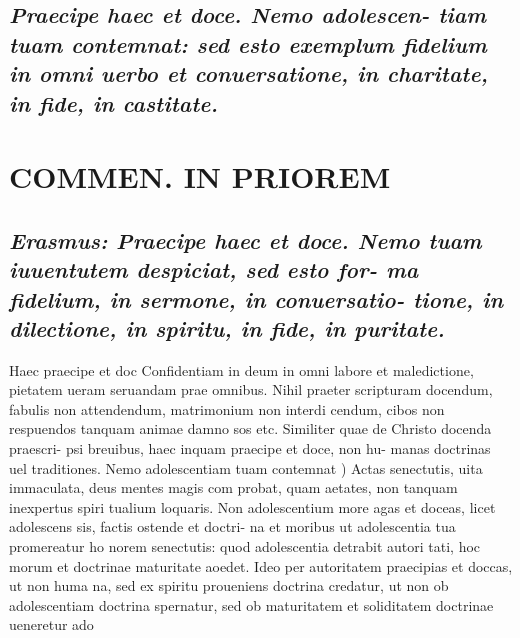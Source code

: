 \documentclass{article}
\begin{document}
\begin{pages}
\subsection*{\textit{Praecipe haec et doce. Nemo adolescen- tiam tuam contemnat: sed esto exemplum fidelium in omni uerbo et conuersatione, in charitate, in fide, in castitate. }}
\section*{COMMEN. IN PRIOREM }
\marginpar{[ p.108 ]}
{}
\subsection*{\textit{Erasmus: Praecipe haec et doce. Nemo tuam iuuentutem despiciat, sed esto for- ma fidelium, in sermone, in conuersatio- tione, in dilectione, in spiritu, in fide, in puritate. }}\pstart Haec praecipe et doc Confidentiam in deum in omni labore et maledictione, pietatem ueram seruandam prae omnibus. Nihil praeter scripturam docendum, fabulis non attendendum, matrimonium non interdi cendum, cibos non respuendos tanquam animae damno sos etc. Similiter quae de Christo docenda praescri- psi breuibus, haec inquam praecipe et doce, non hu- manas doctrinas uel traditiones.  \pend\pstart Nemo adolescentiam tuam contemnat ) Actas senectutis, uita immaculata, deus mentes magis com probat, quam aetates, non tanquam inexpertus spiri tualium loquaris. Non adolescentium more agas et doceas, licet adolescens sis, factis ostende et doctri- na et moribus ut adolescentia tua promereatur ho norem senectutis: quod adolescentia detrabit autori tati, hoc morum et doctrinae maturitate aoedet. Ideo per autoritatem praecipias et doccas, ut non huma na, sed ex spiritu proueniens doctrina credatur, ut non ob adolescentiam doctrina spernatur, sed ob maturitatem et soliditatem doctrinae ueneretur ado  \pend

\end{pages}
\end{document}

